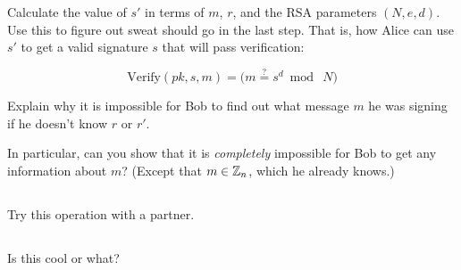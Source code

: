 \documentclass[12pt]{article}
\begin{document}
Calculate the value of $s'$ in terms of  $m$, $r$, and the RSA parameters $(N, e, d)$. Use this to figure out sweat should go in the last step. That is, how Alice can use $s'$ to get a valid signature $s$ that will pass verification:

$$\text{Verify}(pk, s, m) = \Big( m \overset{?}{=} s^d \bmod~N \Big)$$

Explain why it is impossible for Bob to find out what message $m$ he was signing if he doesn't know $r$ or $r'$.

In particular, can you show that it is \emph{completely} impossible for Bob to get any information about $m$? (Except that $m \in \mathbb{Z}_n$, which he already knows.)


\subsection{}

Try this operation with a partner.

\subsection{}

Is this cool or what?
\end{document}
